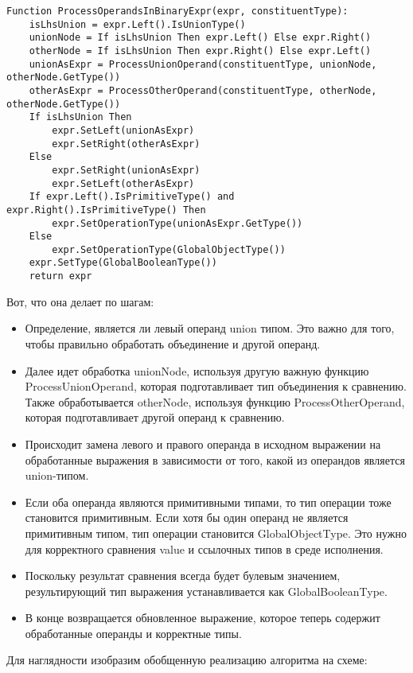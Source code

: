 \begin{lstlisting}[label={lst:processBinary}]
Function ProcessOperandsInBinaryExpr(expr, constituentType):
    isLhsUnion = expr.Left().IsUnionType()
    unionNode = If isLhsUnion Then expr.Left() Else expr.Right()
    otherNode = If isLhsUnion Then expr.Right() Else expr.Left()
    unionAsExpr = ProcessUnionOperand(constituentType, unionNode, otherNode.GetType())
    otherAsExpr = ProcessOtherOperand(constituentType, otherNode, otherNode.GetType())
    If isLhsUnion Then
        expr.SetLeft(unionAsExpr)
        expr.SetRight(otherAsExpr)
    Else
        expr.SetRight(unionAsExpr)
        expr.SetLeft(otherAsExpr)
    If expr.Left().IsPrimitiveType() and expr.Right().IsPrimitiveType() Then
        expr.SetOperationType(unionAsExpr.GetType())
    Else
        expr.SetOperationType(GlobalObjectType())
    expr.SetType(GlobalBooleanType())
    return expr
\end{lstlisting}
Вот, что она делает по шагам:

\begin{itemize}[left=2em]
    \item Определение, является ли левый операнд union типом.
    Это важно для того, чтобы правильно обработать объединение и другой операнд.
    \item Далее идет обработка unionNode, используя другую важную функцию ProcessUnionOperand, которая подготавливает
    тип объединения к сравнению.
    Также обработывается otherNode, используя функцию ProcessOtherOperand, которая подготавливает другой операнд к сравнению.
    \item Происходит замена левого и правого операнда в исходном выражении на обработанные выражения в зависимости от
    того, какой из операндов является union-типом.
    \item Если оба операнда являются примитивными типами, то тип операции тоже становится примитивным.
    Если хотя бы один операнд не является примитивным типом, тип операции становится GlobalObjectType.
    Это нужно для корректного сравнения value и ссылочных типов в среде исполнения.
    \item Поскольку результат сравнения всегда
    будет булевым значением, результирующий тип выражения устанавливается как GlobalBooleanType.
    \item В конце возвращается обновленное выражение, которое теперь содержит обработанные операнды и корректные типы.
\end{itemize}
Для наглядности изобразим обобщенную реализацию алгоритма на схеме:

